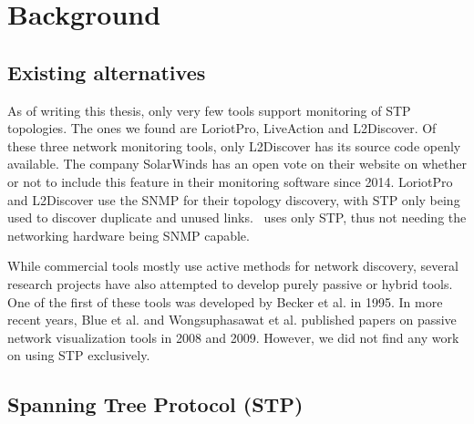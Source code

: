 \chapter{Background}
\label{background}
\section{Existing alternatives}
As of writing this thesis, only very few tools support monitoring of STP topologies.
The ones we found are LoriotPro\cite{LoriotPro}, LiveAction\cite{LiveAction} and L2Discover\cite{L2Discover}.
Of these three network monitoring tools, only L2Discover has its source code openly available.
The company SolarWinds has an open vote on their website on whether or not to include this feature in their monitoring software since 2014\cite{thwackSW}.
LoriotPro and L2Discover use the SNMP for their topology discovery, with STP only being used to discover duplicate and unused links.
\tool\ uses only STP, thus not needing the networking hardware being SNMP capable.

While commercial tools mostly use active methods for network discovery, several research projects have also attempted to develop purely passive or hybrid tools.
One of the first of these tools was developed by Becker et al.\cite{becker1995} in 1995.
In more recent years, Blue et al.\cite{blue2008} and Wongsuphasawat et al.\cite{wongsuphasawat2009} published papers on passive network visualization tools in 2008 and 2009.
However, we did not find any work on using STP exclusively.

\section{Spanning Tree Protocol (STP)}
\label{stp}
